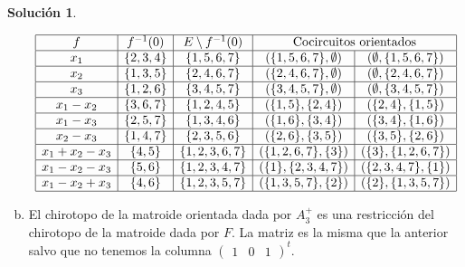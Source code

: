 \documentclass[10pt]{article}
\theoremstyle{definition}
\newtheorem*{sol}{Solución}
\begin{document}
\begin{sol}
\begin{enumerate}[(a)]
$$\begin{array}{|c|c|c|c|c|}
\hline f & f^{-1}(0) & E\setminus f^{-1}(0) & \multicolumn{2}{c|}{\text{Cocircuitos orientados}} \\
\hline x_1 & \{2,3,4\} & \{1,5,6,7\} & (\{1,5,6,7\},\emptyset) & (\emptyset,\{1,5,6,7\})\\
\hline x_2 & \{1,3,5\} & \{2,4,6,7\} &  (\{2,4,6,7\},\emptyset) & (\emptyset,\{2,4,6,7\})\\
\hline x_3 & \{1,2,6\} & \{3,4,5,7\} & (\{3,4,5,7\},\emptyset) & (\emptyset,\{3,4,5,7\})\\
\hline x_1-x_2 & \{3,6,7\} & \{1,2,4,5\} & (\{1,5\},\{2,4\}) & (\{2,4\},\{1,5\})\\
\hline x_1-x_3 & \{2,5,7\} & \{1,3,4,6\} & (\{1,6\},\{3,4\}) & (\{3,4\},\{1,6\})\\
\hline x_2-x_3 & \{1,4,7\} & \{2,3,5,6\} &  (\{2,6\},\{3,5\}) & (\{3,5\},\{2,6\})\\
\hline x_1+x_2-x_3 & \{4,5\} & \{1,2,3,6,7\} & (\{1,2,6,7\},\{3\}) & (\{3\},\{1,2,6,7\})\\
\hline x_1-x_2-x_3 & \{5,6\} & \{1,2,3,4,7\} & (\{1\},\{2,3,4,7\}) & (\{2,3,4,7\},\{1\})\\
\hline x_1-x_2+x_3 & \{4,6\} & \{1,2,3,5,7\} & (\{1,3,5,7\},\{2\}) & (\{2\},\{1,3,5,7\})\\
\hline
\end{array}$$
\item El chirotopo de la matroide orientada dada por $A_3^+$ es una restricción del chirotopo de la matroide dada por $F$. La matriz es la misma que la anterior salvo que no tenemos la columna $\begin{pmatrix}1 & 0 & 1\end{pmatrix}^t$.

\end{enumerate}
\end{sol}
\end{document}
